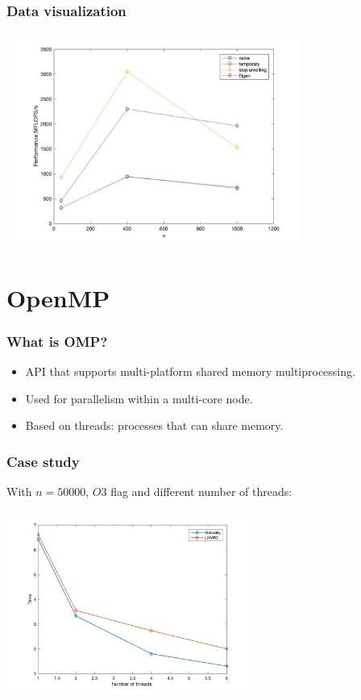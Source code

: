 \documentclass{beamer}
\begin{document}
\begin{frame}
\frametitle{Data visualization}
\includegraphics[width=10cm, height=7cm]{plotcolor}
\end{frame}


\section{OpenMP}

\begin{frame}
\frametitle{What is OMP?}
\begin{itemize}
\item API that supports multi-platform shared memory multiprocessing.
\item Used for parallelism within a multi-core node.
\item Based on threads: processes that can share memory.
\end{itemize}
\end{frame}

\begin{frame}
\frametitle{Case study}
With $n = 50000$, $O3$ flag and different number of threads: 
\begin{center}
\includegraphics[width=8cm, height=6cm]{graficotimes}
\end{center}
\end{frame}
\end{document}
